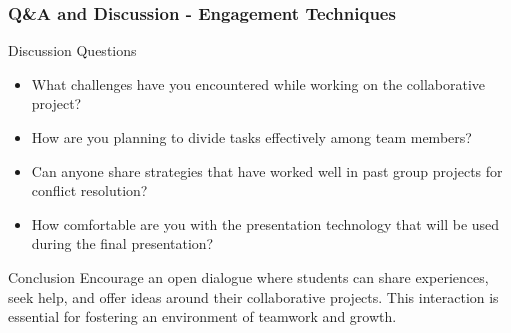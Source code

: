 \documentclass[aspectratio=169]{beamer}
\begin{document}
\begin{frame}[fragile]
  \frametitle{Q\&A and Discussion - Engagement Techniques}
  \begin{block}{Discussion Questions}
    \begin{itemize}
      \item What challenges have you encountered while working on the collaborative project?
      \item How are you planning to divide tasks effectively among team members?
      \item Can anyone share strategies that have worked well in past group projects for conflict resolution?
      \item How comfortable are you with the presentation technology that will be used during the final presentation? 
    \end{itemize}
  \end{block}
  
  \begin{block}{Conclusion}
    Encourage an open dialogue where students can share experiences, seek help, and offer ideas around their collaborative projects. This interaction is essential for fostering an environment of teamwork and growth.
  \end{block}
\end{frame}
\end{document}
